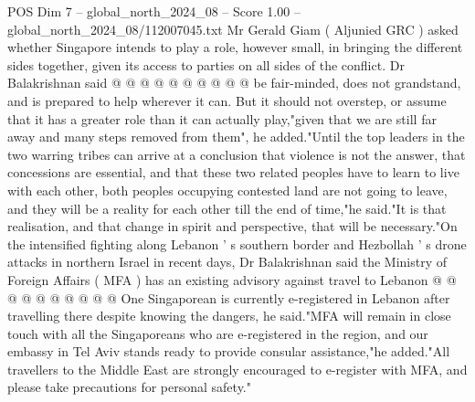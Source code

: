 \begin{textsample}{POS Dim 7 – global\_north\_2024\_08 – Score 1.00 – global\_north\_2024\_08/112007045.txt}
Mr Gerald Giam ( Aljunied GRC ) asked whether Singapore intends to play a role, however small, in bringing the different sides together, given its access to parties on all sides of the conflict.
Dr Balakrishnan said @ @ @ @ @ @ @ @ @ @ be fair-minded, does not grandstand, and is prepared to help wherever it can.
But it should not overstep, or assume that it has a greater role than it can actually play,"given that we are still far away and many steps removed from them", he added."Until the top leaders in the two warring tribes can arrive at a conclusion that violence is not the answer, that concessions are essential, and that these two related peoples have to learn to live with each other, both peoples occupying contested land are not going to leave, and they will be a reality for each other till the end of time,"he said."It is that realisation, and that change in spirit and perspective, that will be necessary."On the intensified fighting along Lebanon ' s southern border and Hezbollah ' s drone attacks in northern Israel in recent days, Dr Balakrishnan said the Ministry of Foreign Affairs ( MFA ) has an existing advisory against travel to Lebanon @ @ @ @ @ @ @ @ @ @ One Singaporean is currently e-registered in Lebanon after travelling there despite knowing the dangers, he said."MFA will remain in close touch with all the Singaporeans who are e-registered in the region, and our embassy in Tel Aviv stands ready to provide consular assistance,"he added."All travellers to the Middle East are strongly encouraged to e-register with MFA, and please take precautions for personal safety."

\end{textsample}
